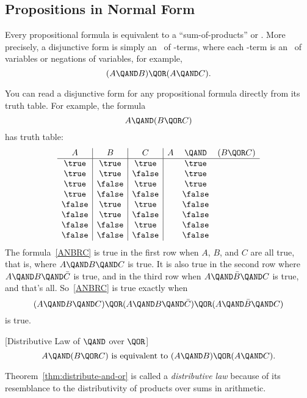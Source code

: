 \subsection{Propositions in Normal Form}\label{normal_form_sec}
Every propositional formula is equivalent to a ``sum-of-products''
or .  More precisely, a disjunctive form is
simply an \QOR\ of \QAND-terms, where each \QAND-term is an \QAND\ of
variables or negations of variables, for example, 
\begin{equation}\label{ANBOANC}
(A \QAND B) \QOR (A \QAND C).
\end{equation}

You can read a disjunctive form for any propositional formula directly
from its truth table.  For example, the formula
\begin{equation}\label{ANBRC}
A \QAND (B \QOR C)
\end{equation}
has truth table:
\[\begin{array}{c|c|c|ccc}
A      & B      & C       & A & \QAND & (B \QOR C)\label{ANBRCTT}\\
\hline \true  & \true  & \true   &   &  \true\\
\true  & \true  & \false  &   &  \true\\
\true  & \false & \true   &   &  \true\\
\true  & \false & \false  &   &  \false\\
\false & \true  & \true   &   &  \false\\
\false & \true  & \false  &   &  \false\\
\false & \false & \true   &   &  \false\\
\false & \false & \false  &   &  \false
\end{array}\]
The formula~\eqref{ANBRC} is true in the first row when $A$, $B$, and
$C$ are all true, that is, where $A \QAND B \QAND C$ is true.  It is
also true in the second row where $A \QAND B \QAND \bar{C}$ is true,
and in the third row when $A \QAND \bar{B} \QAND C$ is true, and
that's all.  So~\eqref{ANBRC} is true exactly when
\begin{equation}\label{ABCDNF}
(A \QAND B \QAND C) \QOR (A \QAND B \QAND \bar{C}) \QOR
  (A \QAND \bar{B} \QAND C)
\end{equation}
is true.
\begin{theorem}\label{thm:distribute-and-or}[Distributive Law of $\QAND$ over $\QOR$]%
\[
A \QAND (B \QOR C)\text{ is equivalent to } (A \QAND B) \QOR (A \QAND C).
\]
\end{theorem}
Theorem~\ref{thm:distribute-and-or} is called a \emph{distributive law}
because of its resemblance to the distributivity of products
over sums in arithmetic.

